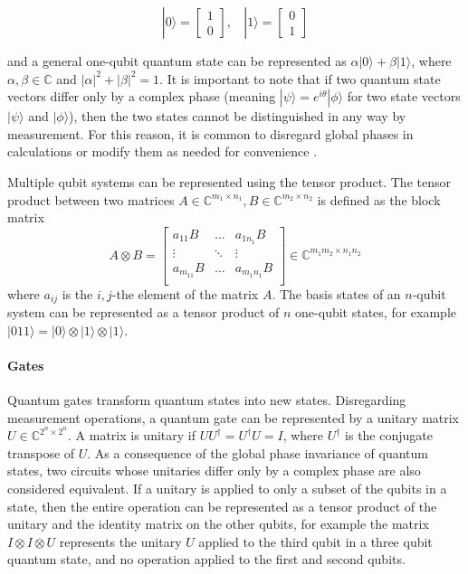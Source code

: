 \documentclass[letterpaper]{article} %
\begin{document}
\begin{equation}
	|0\rangle = \begin{bmatrix} 1 \\ 0 \end{bmatrix}
	,~~~~
	|1\rangle = \begin{bmatrix} 0 \\ 1 \end{bmatrix}
\end{equation}

and a general one-qubit quantum state can be represented as $\alpha|0\rangle + \beta|1\rangle$,
where $\alpha,\beta\in\mathbb{C}$ and $|\alpha|^2+|\beta|^2=1$.
It is important to note that if two quantum state vectors differ only by a complex
phase (meaning $|\psi\rangle=e^{i\theta}|\phi\rangle$ for two state vectors $|\psi\rangle$ and $|\phi\rangle$),
then the two states cannot be distinguished in any way by measurement.
For this reason, it is common to disregard global phases in calculations or modify them as needed for convenience
\cite{nielsen2010quantum}.


Multiple qubit systems can be represented using the tensor product.
The tensor product between two matrices $A \in \mathbb{C}^{m_1 \times n_1},B \in \mathbb{C}^{m_2 \times n_2}$
is defined as the block matrix
\begin{equation}
	A \otimes B =
	\begin{bmatrix}
		a_{11} B   & \dots  & a_{1n_1} B    \\
		\vdots     & \ddots & \vdots        \\
		a_{m_11} B & \dots  &  a_{m_1n_1} B \\
	\end{bmatrix}
	\in \mathbb{C}^{m_1m_2 \times n_1n_2}
\end{equation}
where $a_{ij}$ is the $i,j$-the element of the matrix $A$.
The basis states of an $n$-qubit system can be represented as a tensor product of $n$ one-qubit states,
for example $|011\rangle = |0\rangle \otimes |1\rangle \otimes |1\rangle$.


\paragraph{Gates}

Quantum gates transform quantum states into new states.
Disregarding measurement operations, a quantum gate can be represented by a unitary matrix $U \in \mathbb{C}^{2^n \times 2^n}$.
A matrix is unitary if $UU^{\dagger}=U^{\dagger}U=I$, where $U^{\dagger}$ is the conjugate transpose of $U$.
As a consequence of the global phase invariance of quantum states, two circuits whose unitaries differ only by a complex
phase are also considered equivalent.
If a unitary is applied to only a subset of the qubits in a state, then the entire operation can be represented
as a tensor product of the unitary and the identity matrix on the other qubits, for example the matrix
$I \otimes I \otimes U$ represents the unitary $U$ applied to the third qubit in a three qubit quantum state, and no operation
applied to the first and second qubits.
\end{document}
